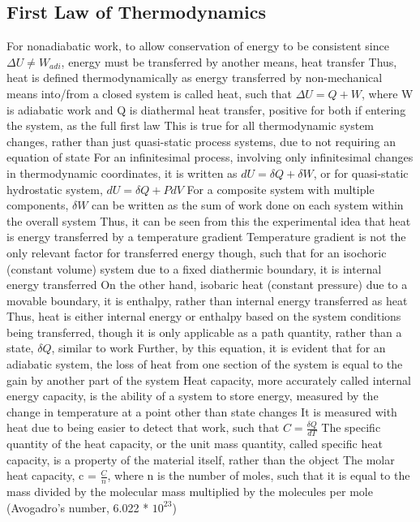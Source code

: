 \subsection{First Law of Thermodynamics}
\begin{outline*}
\1 For nonadiabatic work, to allow conservation of energy to be consistent since $\Delta U \neq W_{adi}$, energy must be transferred by another means, heat transfer
\2 Thus, heat is defined thermodynamically as energy transferred by non-mechanical means into/from a closed system is called heat, such that $\Delta U = Q + W$, where W is adiabatic work and Q is diathermal heat transfer, positive for both if entering the system, as the full first law
\3 This is true for all thermodynamic system changes, rather than just quasi-static process systems, due to not requiring an equation of state
\3 For an infinitesimal process, involving only infinitesimal changes in thermodynamic coordinates, it is written as $dU = \delta Q + \delta W$, or for quasi-static hydrostatic system, $dU = \delta Q + PdV$
\3 For a composite system with multiple components, $\delta W$ can be written as the sum of work done on each system within the overall system
\2 Thus, it can be seen from this the experimental idea that heat is energy transferred by a temperature gradient
\2 Temperature gradient is not the only relevant factor for transferred energy though, such that for an isochoric (constant volume) system due to a fixed diathermic boundary, it is internal energy transferred
\3 On the other hand, isobaric heat (constant pressure) due to a movable boundary, it is enthalpy, rather than internal energy transferred as heat
\3 Thus, heat is either internal energy or enthalpy based on the system conditions being transferred, though it is only applicable as a path quantity, rather than a state, $\delta Q$, similar to work
\2 Further, by this equation, it is evident that for an adiabatic system, the loss of heat from one section of the system is equal to the gain by another part of the system
\1 Heat capacity, more accurately called internal energy capacity, is the ability of a system to store energy, measured by the change in temperature at a point other than state changes
\2 It is measured with heat due to being easier to detect that work, such that $C = \frac{\delta Q}{dT}$
\2 The specific quantity of the heat capacity, or the unit mass quantity, called specific heat capacity, is a property of the material itself, rather than the object
\3 The molar heat capacity, c = $\frac{C}{n}$, where n is the number of moles, such that it is equal to the mass divided by the molecular mass multiplied by the molecules per mole (Avogadro's number, 6.022 * $10^23$)

\end{outline*}
